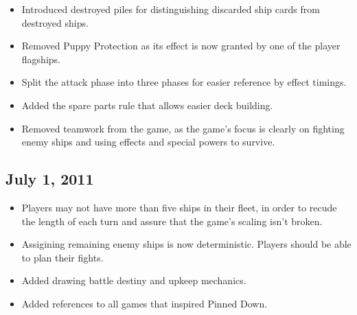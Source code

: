 \documentclass[11pt, a4paper]{article}
\begin{document}
\begin{itemize}
 \item Introduced destroyed piles for distinguishing discarded ship
cards from destroyed ships.
 \item Removed Puppy Protection as its effect is now granted by one of the
player flagships.
 \item Split the attack phase into three phases for easier reference by effect
timings.
 \item Added the spare parts rule that allows easier deck building.
 \item Removed teamwork from the game, as the game's focus is clearly on
fighting enemy ships and using effects and special powers to survive.
\end{itemize}

\subsection{July 1, 2011}

\begin{itemize}
 \item Players may not have more than five ships in their fleet, in order to
recude the length of each turn and assure that the game's scaling isn't broken.
 \item Assigining remaining enemy ships is now deterministic. Players should be
able to plan their fights.
 \item Added drawing battle destiny and upkeep mechanics.
 \item Added references to all games that inspired Pinned Down.
\end{itemize}
\end{document}
